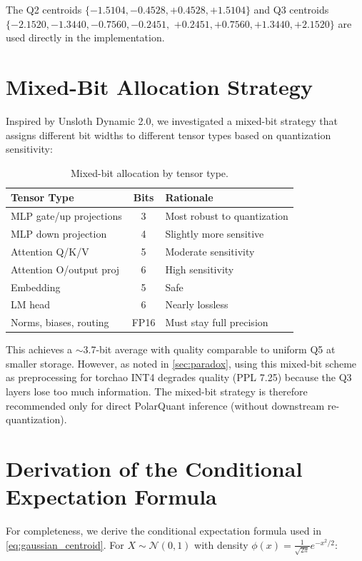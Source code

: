 \documentclass[10pt,twocolumn]{article}
\begin{document}
The Q2 centroids $\{-1.5104, -0.4528, +0.4528, +1.5104\}$ and Q3 centroids $\{-2.1520, -1.3440, -0.7560, -0.2451,$ $+0.2451, +0.7560, +1.3440, +2.1520\}$ are used directly in the implementation.

\section{Mixed-Bit Allocation Strategy}
\label{app:mixedbit}

Inspired by Unsloth Dynamic 2.0, we investigated a mixed-bit strategy that assigns different bit widths to different tensor types based on quantization sensitivity:

\begin{table}[h]
\centering
\caption{Mixed-bit allocation by tensor type.}
\label{tab:mixedbit}
\small
\begin{tabular}{@{}lcl@{}}
\toprule
\textbf{Tensor Type} & \textbf{Bits} & \textbf{Rationale} \\
\midrule
MLP gate/up projections & 3 & Most robust to quantization \\
MLP down projection & 4 & Slightly more sensitive \\
Attention Q/K/V & 5 & Moderate sensitivity \\
Attention O/output proj & 6 & High sensitivity \\
Embedding & 5 & Safe \\
LM head & 6 & Nearly lossless \\
Norms, biases, routing & FP16 & Must stay full precision \\
\bottomrule
\end{tabular}
\end{table}

This achieves a ${\sim}$3.7-bit average with quality comparable to uniform Q5 at smaller storage. However, as noted in \cref{sec:paradox}, using this mixed-bit scheme as preprocessing for torchao INT4 degrades quality (PPL 7.25) because the Q3 layers lose too much information. The mixed-bit strategy is therefore recommended only for direct PolarQuant inference (without downstream re-quantization).

\section{Derivation of the Conditional Expectation Formula}
\label{app:derivation}

For completeness, we derive the conditional expectation formula used in \cref{eq:gaussian_centroid}. For $X \sim \mathcal{N}(0,1)$ with density $\phi(x) = \frac{1}{\sqrt{2\pi}} e^{-x^2/2}$:
\end{document}
